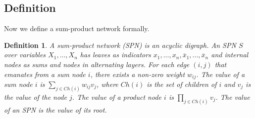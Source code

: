 \documentclass[a4paper,10pt]{article}
\theoremstyle{plain}
\newtheorem*{spn-def}{Definition}
\begin{document}
\subsection{Definition}

Now we define a sum-product network formally.

\begin{spn-def}
  A sum-product network (SPN) is an acyclic digraph. An SPN $S$ over variables $X_1,\ldots,X_n$ has
  leaves as indicators $x_1,\ldots,x_n,\overline{x}_1,\ldots,\overline{x}_n$ and internal nodes as
  sums and nodes in alternating layers. For each edge $(i,j)$ that emanates from a sum node $i$,
  there exists a non-zero weight $w_{ij}$. The value of a sum node $i$ is $\sum_{j\in Ch(i)}
  w_{ij}v_j$, where $Ch(i)$ is the set of children of $i$ and $v_j$ is the value of the node $j$.
  The value of a product node $i$ is $\prod_{j\in Ch(i)} v_j$. The value of an SPN is the value of
  its root.
\end{spn-def}

\begin{figure}[h]
  \captionsetup{justification=centering}
\end{figure}
\end{document}

